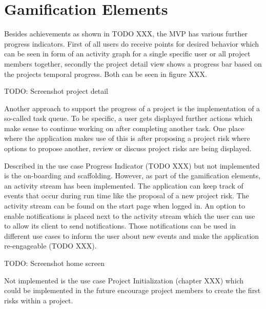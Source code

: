 
\section{Gamification Elements}
\label{sec:implementationGami}

Besides achievements as shown in TODO XXX, the MVP has various further progress indicators. First of all users do receive points for desired behavior which can be seen in form of an activity graph for a single specific user or all project members together, secondly the project detail view shows a progress bar based on the projects temporal progress. Both can be seen in figure XXX.

TODO: Screenshot project detail

Another approach to support the progress of a project is the implementation of a so-called task queue. To be specific, a user gets displayed further actions which make sense to continue working on after completing another task. One place where the application makes use of this is after proposing a project risk where options to propose another, review or discuss project risks are being displayed.

Described in the use case Progress Indicator (TODO XXX) but not implemented is the on-boarding and scaffolding. However, as part of the gamification elements, an activity stream has been implemented. The application can keep track of events that occur during run time like the proposal of a new project risk. The activity stream can be found on the start page when logged in. An option to enable notifications is placed next to the activity stream which the user can use to allow its client to send notifications. Those notifications can be used in different use cases to inform the user about new events and make the application re-engageable (TODO XXX).

TODO: Screenshot home screen

Not implemented is the use case Project Initialization (chapter XXX) which could be implemented in the future encourage project members to create the first risks within a project.